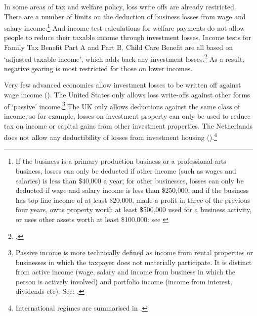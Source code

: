 In some areas of tax and welfare policy, loss write offs are already restricted. 
There are a number of limits on the deduction of business losses from wage and salary income.\footnote{If the business is a primary production business or a professional arts business, losses can only be deducted if other income (such as wages and salaries) is less than \$40,000 a year; for other businesses, losses can only be deducted if wage and salary income is less than \$250,000, and if the business has top-line income of at least \$20,000, made a profit in three of the previous four years, owns property worth at least \$500,000 used for a business activity, or uses other assets worth at least \$100,000: see \textcite{ATO2015OffsettingCurrentYearLosses}}
And income test calculations for welfare payments do not allow people to reduce their taxable income through investment losses. Income tests for Family Tax Benefit Part A and Part B, Child Care Benefit are all based on ‘adjusted taxable income’, which adds back any investment losses.\footcite{DHS2015AdjustedTaxableIncome} 
As a result, negative gearing is most restricted for those on lower incomes.

Very few advanced economies allow investment losses to be written off against wage income (). 
The United States only allows loss write-offs against other forms of ‘passive’ income.\footnote{Passive income\label{footnote:passive-income} is more technically defined as income from rental properties or businesses in which the taxpayer does not materially participate. It is distinct from active income (wage, salary and income from business in which the person is actively involved) and portfolio income (income from interest, dividends etc). See: \textcite{IRS2015}.} 
The UK only allows deductions against the same class of income, so for example, losses on investment property can only be used to reduce tax on income or capital gains from other investment properties. 
The Netherlands does not allow any deductibility of losses from investment housing ().\footnote{International regimes are summarised in \textcites[][43]{RBA2014SubmissionAffordableHousingInquiry}[][86]{ProductivityCommission2004FirstHomeOwnership}[][92--95]{ODonnell2005}.}

